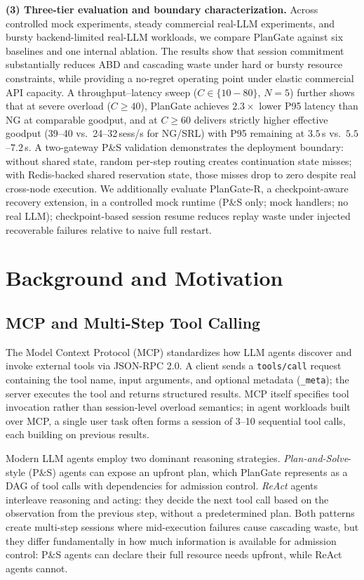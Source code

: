 \documentclass[sigconf,review,anonymous]{acmart}
\begin{document}
\noindent\textbf{(3) Three-tier evaluation and boundary characterization.} Across controlled mock experiments, steady commercial real-LLM experiments, and bursty backend-limited real-LLM workloads, we compare PlanGate against six baselines and one internal ablation. The results show that session commitment substantially reduces ABD and cascading waste under hard or bursty resource constraints, while providing a no-regret operating point under elastic commercial API capacity. A throughput--latency sweep ($C{\in}\{10{-}80\}$, $N{=}5$) further shows that at severe overload ($C{\ge}40$), PlanGate achieves $\mathbf{2.3{\times}}$ lower P95 latency than NG at comparable goodput, and at $C{\ge}60$ delivers strictly higher effective goodput (39--40 vs.~24--32\,sess/s for NG/SRL) with P95 remaining at $3.5$\,s vs.\ $5.5$--$7.2$\,s. A two-gateway P\&S validation demonstrates the deployment boundary: without shared state, random per-step routing creates continuation state misses; with Redis-backed shared reservation state, those misses drop to zero despite real cross-node execution. We additionally evaluate PlanGate-R, a checkpoint-aware recovery extension, in a controlled mock runtime (P\&S only; mock handlers; no real LLM); checkpoint-based session resume reduces replay waste under injected recoverable failures relative to naive full restart.

\section{Background and Motivation}


\subsection{MCP and Multi-Step Tool Calling}

The Model Context Protocol (MCP) standardizes how LLM agents discover and invoke external tools via JSON-RPC 2.0. A client sends a \texttt{tools/call} request containing the tool name, input arguments, and optional metadata (\texttt{\_meta}); the server executes the tool and returns structured results. MCP itself specifies tool invocation rather than session-level overload semantics; in agent workloads built over MCP, a single user task often forms a session of 3--10 sequential tool calls, each building on previous results.


Modern LLM agents employ two dominant reasoning strategies. \emph{Plan-and-Solve}-style (P\&S) agents can expose an upfront plan, which PlanGate represents as a DAG of tool calls with dependencies for admission control. \emph{ReAct} agents interleave reasoning and acting: they decide the next tool call based on the observation from the previous step, without a predetermined plan. Both patterns create multi-step sessions where mid-execution failures cause cascading waste, but they differ fundamentally in how much information is available for admission control: P\&S agents can declare their full resource needs upfront, while ReAct agents cannot.
\end{document}
